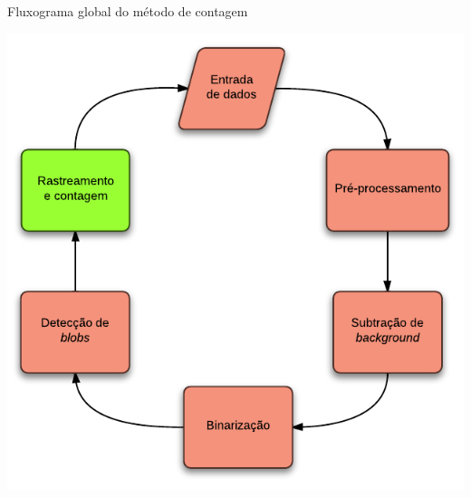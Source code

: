 \begin{frame}{Fluxograma global do método de contagem}
  \begin{center}
    \includegraphics[scale=0.55]{imgs/general_process.pdf}
  \end{center}
\end{frame}

